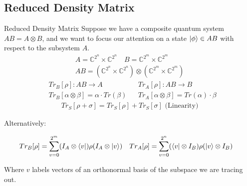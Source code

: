 \documentclass[11pt,svgnames,smaller,aspectratio=43,english]{beamer}
\newcommand{\tensor}{\otimes}
\begin{document}
\subsection{Reduced Density Matrix}
\begin{frame}{Reduced Density Matrix}
	Suppose we have a composite quantum system $AB = A \tensor B$, and we want to focus our attention on a state $\ket{\phi} \in AB$ with respect to the subsystem $A$.
	\begin{gather*}
		A = \mathbb{C}^{2^n}\times\mathbb{C}^{2^n}\quad
		B = \mathbb{C}^{2^m}\times\mathbb{C}^{2^m}\\
		AB = (\mathbb{C}^{2^n}\times\mathbb{C}^{2^n})\tensor(\mathbb{C}^{2^m}\times\mathbb{C}^{2^m})
	\end{gather*}
	\vspace*{-2em}
	\begin{align*}
		&Tr_B[\rho] : AB \rightarrow A && Tr_A[\rho] : AB \rightarrow B\\
		&Tr_B[\alpha\tensor\beta] = \alpha \cdot Tr(\beta) &&
		Tr_A[\alpha\tensor\beta] = Tr(\alpha) \cdot \beta
	\end{align*}
	\vspace*{-2em}
	\begin{gather*}
		Tr_S[\rho + \sigma] = Tr_S[\rho] + Tr_S[\sigma] \text{ (Linearity)}
	\end{gather*}
	\begin{center}
		Alternatively:
	\end{center}
	\vspace*{-2em}
	\begin{align*}
		Tr_B[\rho] &= \sum_{v=0}^{2^m} (I_A \tensor \bra{v})\rho(I_A \tensor \ket{v}) && Tr_A[\rho] = \sum_{v=0}^{2^n} (\bra{v} \tensor I_B)\rho(\ket{v} \tensor I_B)
	\end{align*}
	\begin{center}
		Where $v$ labels vectors of an orthonormal basis of the subspace we are tracing out.		
	\end{center}
\end{frame}
\end{document}
